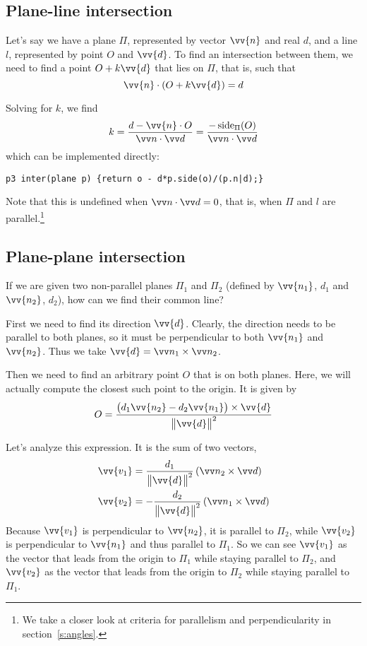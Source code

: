 \subsection{Plane-line intersection}\label{ss:plane-line}
Let's say we have a plane $\Pi$, represented by vector $\vv{n}$ and real $d$, and a line $l$, represented by point $O$ and $\vv{d}$. To find an intersection between them, we need to find a point $O+k\vv{d}$ that lies on $\Pi$, that is, such that
\[\vv{n}\cdot\left(O+k\vv{d}\right) = d\]


Solving for $k$, we find
\[k = \frac{d - \vv{n}\cdot O}{\dotv{n}{d}} = \frac{-\side_{\Pi}(O)}{\dotv{n}{d}}\]
which can be implemented directly:
\begin{lstlisting}
p3 inter(plane p) {return o - d*p.side(o)/(p.n|d);}
\end{lstlisting}

Note that this is undefined when $\dotv{n}{d}=0$, that is, when $\Pi$ and $l$ are parallel.\footnote{We take a closer look at criteria for parallelism and perpendicularity in section~\ref{s:angles}.}
 
\subsection{Plane-plane intersection}
If we are given two non-parallel planes $\Pi_1$ and $\Pi_2$ (defined by $\vv{n_1}$, $d_1$ and $\vv{n_2}$, $d_2$), how can we find their common line?

First we need to find its direction $\vv{d}$. Clearly, the direction needs to be parallel to both planes, so it must be perpendicular to both $\vv{n_1}$ and $\vv{n_2}$. Thus we take $\vv{d} = \crossv{n_1}{n_2}$.

Then we need to find an arbitrary point $O$ that is on both planes. Here, we will actually compute the closest such point to the origin. It is given by
\[O = \frac{\big(d_1\vv{n_2} - d_2\vv{n_1}\big)\times\vv{d}}{\big\|\vv{d}\big\|^2}\]

Let's analyze this expression. It is the sum of two vectors,
\begin{align*}
\vv{v_1} &= \frac{d_1}{\big\|\vv{d}\big\|^2}\left(\crossv{n_2}{d}\right) \\
\vv{v_2} &= -\frac{d_2}{\big\|\vv{d}\big\|^2}\left(\crossv{n_1}{d}\right)
\end{align*}
Because $\vv{v_1}$ is perpendicular to $\vv{n_2}$, it is parallel to $\Pi_2$, while $\vv{v_2}$ is perpendicular to $\vv{n_1}$ and thus parallel to $\Pi_1$. So we can see $\vv{v_1}$ as the vector that leads from the origin to $\Pi_1$ while staying parallel to $\Pi_2$, and $\vv{v_2}$ as the vector that leads from the origin to $\Pi_2$ while staying parallel to $\Pi_1$.

